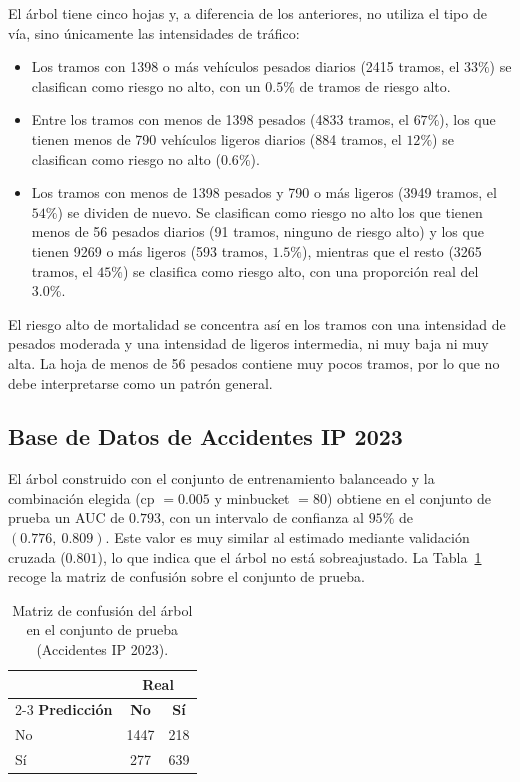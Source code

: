 \documentclass[twoside,a4paper,12pt,onecolumn,openany]{book}
\begin{document}
El árbol tiene cinco hojas y, a diferencia de los anteriores, no utiliza el tipo de vía, sino únicamente las intensidades de tráfico:
 
\begin{itemize}
    \item Los tramos con 1398 o más vehículos pesados diarios (2415 tramos, el $33\%$) se clasifican como riesgo no alto, con un $0.5\%$ de tramos de riesgo alto.
    \item Entre los tramos con menos de 1398 pesados (4833 tramos, el $67\%$), los que tienen menos de 790 vehículos ligeros diarios (884 tramos, el $12\%$) se clasifican como riesgo no alto ($0.6\%$).
    \item Los tramos con menos de 1398 pesados y 790 o más ligeros (3949 tramos, el $54\%$) se dividen de nuevo. Se clasifican como riesgo no alto los que tienen menos de 56 pesados diarios (91 tramos, ninguno de riesgo alto) y los que tienen 9269 o más ligeros (593 tramos, $1.5\%$), mientras que el resto (3265 tramos, el $45\%$) se clasifica como riesgo alto, con una proporción real del $3.0\%$.
\end{itemize}
 
El riesgo alto de mortalidad se concentra así en los tramos con una intensidad de pesados moderada y una intensidad de ligeros intermedia, ni muy baja ni muy alta. La hoja de menos de 56 pesados contiene muy pocos tramos, por lo que no debe interpretarse como un patrón general.
 
\subsection{Base de Datos de Accidentes IP 2023}
 
El árbol construido con el conjunto de entrenamiento balanceado y la combinación elegida (cp $=0.005$ y minbucket $=80$) obtiene en el conjunto de prueba un AUC de $0.793$, con un intervalo de confianza al $95\%$ de $(0.776,\ 0.809)$. Este valor es muy similar al estimado mediante validación cruzada ($0.801$), lo que indica que el árbol no está sobreajustado. La Tabla~\ref{tab:confusion_acc_ip_2023} recoge la matriz de confusión sobre el conjunto de prueba.
 
\begin{table}[H]
    \centering
    \vspace{0.3cm}
    \renewcommand{\arraystretch}{1.3}
    \begin{tabular}{lcc}
        \toprule
        & \multicolumn{2}{c}{\textbf{Real}} \\
        \cmidrule(lr){2-3}
        \textbf{Predicción} & \textbf{No} & \textbf{Sí} \\
        \midrule
        No & 1447 & 218 \\
        Sí & 277  & 639 \\
        \bottomrule
    \end{tabular}
    \caption{Matriz de confusión del árbol en el conjunto de prueba (Accidentes IP 2023).}
    \label{tab:confusion_acc_ip_2023}
\end{table}
 
\end{document}
